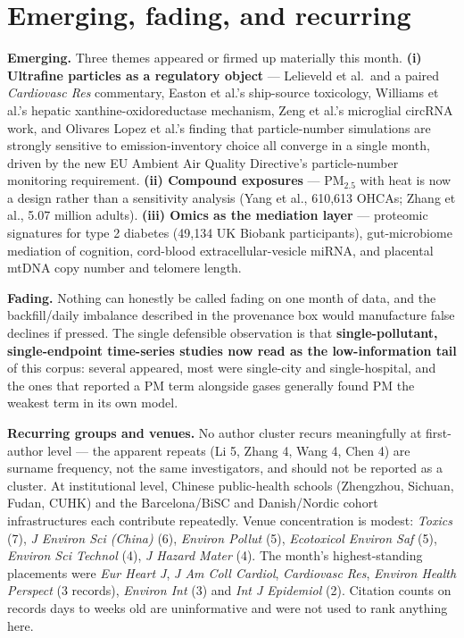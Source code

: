 \documentclass[10pt]{article}
\begin{document}
\section*{\sffamily\bfseries\color{Deep}Emerging, fading, and recurring}
\vspace{-1.5mm}{\color{Coral}\rule{\linewidth}{1.1pt}}\vspace{2.5mm}

\footnotesize
\textbf{Emerging.} Three themes appeared or firmed up materially this month.
\textbf{(i) Ultrafine particles as a regulatory object} --- Lelieveld et al.\ and a
paired \textit{Cardiovasc Res} commentary, Easton et al.'s ship-source toxicology,
Williams et al.'s hepatic xanthine-oxidoreductase mechanism, Zeng et al.'s microglial
circRNA work, and Olivares Lopez et al.'s finding that particle-number simulations are
strongly sensitive to emission-inventory choice all converge in a single month, driven by
the new EU Ambient Air Quality Directive's particle-number monitoring requirement.
\textbf{(ii) Compound exposures} --- PM$_{2.5}$ with heat is now a design rather than a
sensitivity analysis (Yang et al., 610{,}613 OHCAs; Zhang et al., 5.07 million adults).
\textbf{(iii) Omics as the mediation layer} --- proteomic signatures for type 2 diabetes
(49{,}134 UK Biobank participants), gut-microbiome mediation of cognition, cord-blood
extracellular-vesicle miRNA, and placental mtDNA copy number and telomere length.

\vspace{2mm}
\textbf{Fading.} Nothing can honestly be called fading on one month of data, and the
backfill/daily imbalance described in the provenance box would manufacture false
declines if pressed. The single defensible observation is that \textbf{single-pollutant,
single-endpoint time-series studies now read as the low-information tail} of this corpus:
several appeared, most were single-city and single-hospital, and the ones that reported a
PM term alongside gases generally found PM the weakest term in its own model.

\vspace{2mm}
\textbf{Recurring groups and venues.} No author cluster recurs meaningfully at
first-author level --- the apparent repeats (Li 5, Zhang 4, Wang 4, Chen 4) are surname
frequency, not the same investigators, and should not be reported as a cluster. At
institutional level, Chinese public-health schools (Zhengzhou, Sichuan, Fudan, CUHK) and
the Barcelona/BiSC and Danish/Nordic cohort infrastructures each contribute repeatedly.
Venue concentration is modest: \textit{Toxics} (7), \textit{J Environ Sci (China)} (6),
\textit{Environ Pollut} (5), \textit{Ecotoxicol Environ Saf} (5), \textit{Environ Sci
Technol} (4), \textit{J Hazard Mater} (4). The month's highest-standing placements were
\textit{Eur Heart J}, \textit{J Am Coll Cardiol}, \textit{Cardiovasc Res},
\textit{Environ Health Perspect} (3 records), \textit{Environ Int} (3) and
\textit{Int J Epidemiol} (2). Citation counts on records days to weeks old are
uninformative and were not used to rank anything here.
\end{document}
